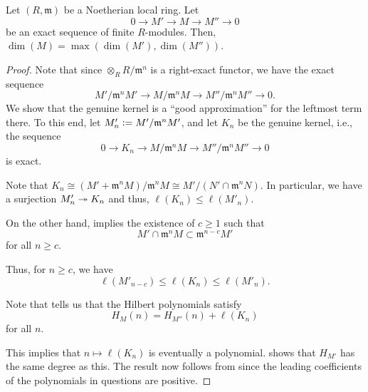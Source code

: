 \documentclass[12pt]{article}
\begin{document}
\begin{prop} \label{prop:local-dimensions-short-exact-sequence}
	Let $(R, \mathfrak{m})$ be a Noetherian local ring. Let
	\begin{equation*} 
		0 \to M' \to M \to M'' \to 0
	\end{equation*}
	be an exact sequence of finite $R$-modules. Then, $\dim(M) = \max(\dim(M'), \dim(M''))$.
\end{prop}
\begin{proof} 
	Note that since $\otimes_{R} R/\mathfrak{m}^{n}$ is a right-exact functor, we have the exact sequence
	\begin{equation*} 
		M'/\mathfrak{m}^{n} M' \to M/\mathfrak{m}^{n} M \to M''/\mathfrak{m}^{n} M'' \to 0.
	\end{equation*}
	We show that the genuine kernel is a ``good approximation'' for the leftmost term there. To this end, let $M'_{n} \vcentcolon= M'/\mathfrak{m}^{n} M'$, and let $K_{n}$ be the genuine kernel, i.e., the sequence
	\begin{equation} \label{eq:003}
		0 \to K_{n} \to M/\mathfrak{m}^{n} M \to M''/\mathfrak{m}^{n} M'' \to 0
	\end{equation}
	is exact.

	Note that $K_{n} \cong (M' + \mathfrak{m}^{n}M)/\mathfrak{m}^{n}M \cong M'/(N' \cap \mathfrak{m}^{n}N)$. In particular, we have a surjection $M'_{n} \twoheadrightarrow K_{n}$ and thus, $\ell(K_{n}) \le \ell(M'_{n})$.

	On the other hand,  implies the existence of $c \ge 1$ such that
	\begin{equation*} 
		M' \cap \mathfrak{m}^{n} M \subset \mathfrak{m}^{n - c} M'
	\end{equation*}
	for all $n \ge c$.

	Thus, for $n \ge c$, we have
	\begin{equation} \label{eq:004}
		\ell(M'_{n - c}) \le \ell(K_{n}) \le \ell(M'_{n}).
	\end{equation}

	Note that  tells us that the Hilbert polynomials satisfy
	\begin{equation} \label{eq:005}
		H_{M}(n) = H_{M''}(n) + \ell(K_{n})
	\end{equation}
	for all $n$.

	This implies that $n \mapsto \ell(K_{n})$ is eventually a polynomial.  shows that $H_{M'}$ has the same degree as this. The result now follows from  since the leading coefficients of the polynomials in questions are positive.
\end{proof}
\end{document}
